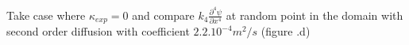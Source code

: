 Take case where $\kappa_{exp}=0$ and compare $k_4 \frac{\partial^4 \psi}{\partial x^4}$ at random point in the domain with second order diffusion with coefficient $2.2 . 10^{-4} m^2/s$ (figure .d)





 
 
 
 


